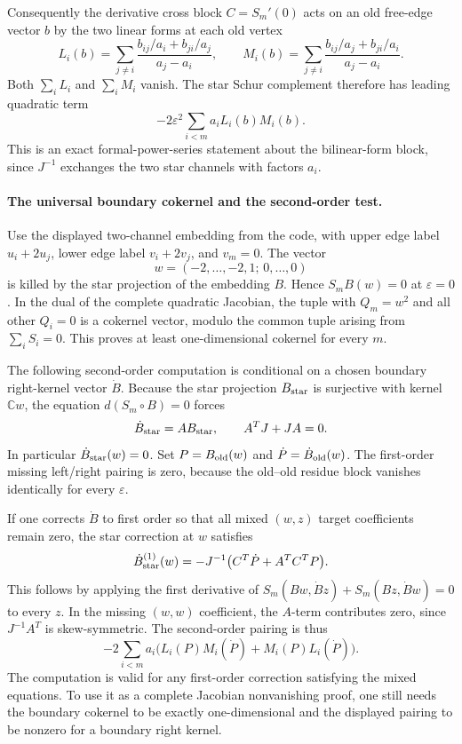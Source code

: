 Consequently the derivative cross block \(C=S_m'(0)\)
acts on an old free-edge vector \(b\) by the two
linear forms at each old vertex
\[
 L_i(b)=\sum_{j\ne i}
        \frac{b_{ij}/a_i+b_{ji}/a_j}{a_j-a_i},
 \qquad
 M_i(b)=\sum_{j\ne i}
        \frac{b_{ij}/a_j+b_{ji}/a_i}{a_j-a_i}.
\]
Both \(\sum_iL_i\) and \(\sum_iM_i\) vanish.
The star Schur complement therefore has leading
quadratic term
\[
        -2\varepsilon^2\sum_{i<m}a_iL_i(b)M_i(b).
\]
This is an exact formal-power-series statement about
the bilinear-form block, since \(J^{-1}\) exchanges
the two star channels with factors \(a_i\).

\paragraph{The universal boundary cokernel and the second-order test.}
Use the displayed two-channel embedding from the code,
with upper edge label \(u_i+2u_j\), lower edge label
\(v_i+2v_j\), and \(v_m=0\). The vector
\[
                 w=(-2,\ldots,-2,1;\,0,\ldots,0)
\]
is killed by the star projection of the embedding \(B\).
Hence \(S_mB(w)=0\) at \(\varepsilon=0\).
In the dual of the complete quadratic Jacobian, the
tuple with \(Q_m=w^2\) and all other \(Q_i=0\) is a
cokernel vector, modulo the common tuple arising from
\(\sum_iS_i=0\). This proves at least one-dimensional
cokernel for every \(m\).

The following second-order computation is conditional
on a chosen boundary right-kernel vector \(\dot B\).
Because the star projection \(B_{\rm star}\) is
surjective with kernel \(\mathbb Cw\), the equation
\(d(S_m\circ B)=0\) forces
\[
 \dot B_{\rm star}=A B_{\rm star},\qquad
                         A^TJ+JA=0.
\]
In particular \(\dot B_{\rm star}(w)=0\). Set
\(P=B_{\rm old}(w)\) and \(\dot P=\dot B_{\rm old}(w)\).
The first-order missing left/right pairing is zero,
because the old--old residue block vanishes identically
for every \(\varepsilon\).

If one corrects \(\dot B\) to first order so that all
mixed \((w,z)\) target coefficients remain zero, the
star correction at \(w\) satisfies
\[
 \dot B_{\rm star}^{(1)}(w)
       =-J^{-1}\bigl(C^T\dot P+A^TC^TP\bigr).
\]
This follows by applying the first derivative of
\(S_m(Bw,\dot Bz)+S_m(Bz,\dot Bw)=0\) to every \(z\).
In the missing \((w,w)\) coefficient, the \(A\)-term
contributes zero, since
\(J^{-1}A^T\) is skew-symmetric. The second-order
pairing is thus
\[
 -2\sum_{i<m}a_i
       \bigl(L_i(P)M_i(\dot P)+M_i(P)L_i(\dot P)\bigr).
\]
The computation is valid for any first-order correction
satisfying the mixed equations. To use it as a complete
Jacobian nonvanishing proof, one still needs the
boundary cokernel to be exactly one-dimensional and
the displayed pairing to be nonzero for a boundary
right kernel.

